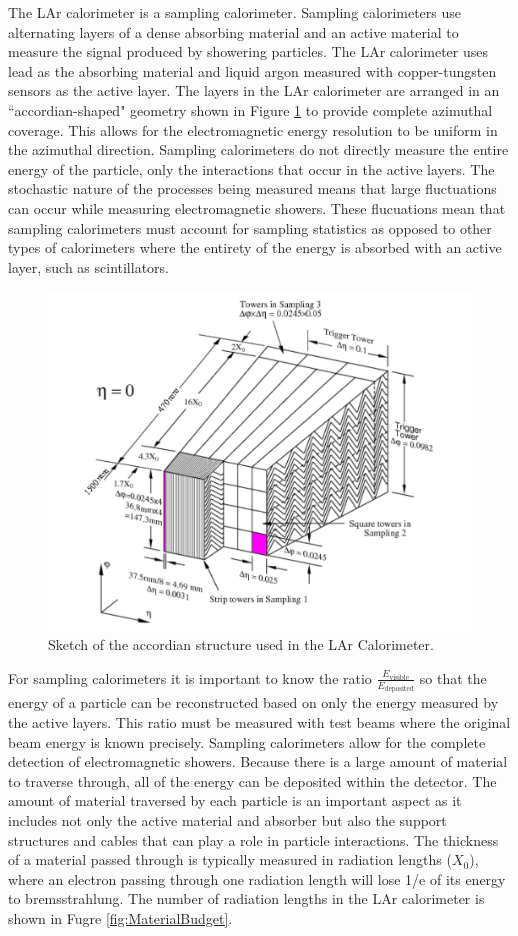 The LAr calorimeter is a sampling calorimeter.  Sampling calorimeters use alternating layers of a dense absorbing material and an active material to measure the signal produced by showering particles.  The LAr calorimeter uses lead as the absorbing material and liquid argon measured with copper-tungsten sensors as the active layer.  The layers in the LAr calorimeter are arranged in an ``accordian-shaped" geometry shown in Figure \ref{fig:LArAccordian} to provide complete azimuthal coverage.  This allows for the electromagnetic energy resolution to be uniform in the azimuthal direction.  Sampling calorimeters do not directly measure the entire energy of the particle, only the interactions that occur in the active layers. The stochastic nature of the processes being measured means that large fluctuations can occur while measuring electromagnetic showers.  These flucuations mean that sampling calorimeters must account for sampling statistics as opposed to other types of calorimeters where the entirety of the energy is absorbed with an active layer, such as scintillators.  
\begin{figure}[ht!]
	\centering
	\includegraphics[width=0.7\columnwidth]{../ThesisImages/LHCImages/LArAccordian.png}
	\caption[Sketch of the accordian structure used in the LAr Calorimeter.]{Sketch of the accordian structure used in the LAr Calorimeter\cite{CERN-LHCC-96-041}.
	}
	\label{fig:LArAccordian}
\end{figure}

For sampling calorimeters it is important to know the ratio $\frac{E_{\text{visible}}}{E_{\text{deposited}}}$ so that the energy of a particle can be reconstructed based on only the energy measured by the active layers.  This ratio must be measured with test beams where the original beam energy is known precisely.  Sampling calorimeters allow for the complete detection of electromagnetic showers.  Because there is a large amount of material to traverse through, all of the energy can be deposited within the detector. The amount of material traversed by each particle is an important aspect as it includes not only the active material and absorber but also the support structures and cables that can play a role in particle interactions.  The thickness of a material passed through is typically measured in radiation lengths ($X_0$), where an electron passing through one radiation length will lose 1/e of its energy to bremsstrahlung.  The number of radiation lengths in the LAr calorimeter is shown in Fugre \ref{fig:MaterialBudget}.  

